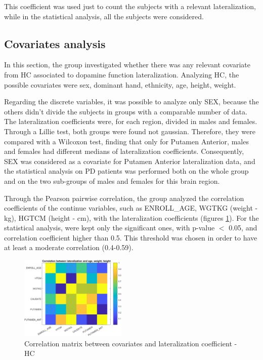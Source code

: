 \documentclass[]{article}
\begin{document}
\begin{multicols}{2}
This coefficient was used just to count the subjects with a relevant lateralization, while in the statistical analysis, all the subjects were considered.

\subsection{Covariates analysis}

In this section, the group investigated whether there was any relevant covariate from HC associated to dopamine function lateralization.
Analyzing HC, the possible covariates were sex, dominant hand, ethnicity, age, height, weight.

Regarding the discrete variables, it was possible to analyze only SEX, because the others didn't divide the subjects in groups with a comparable number of data. 
The lateralization coefficients were, for each region, divided in males and females. Through a Lillie test, both groups were found not gaussian. Therefore, they were compared with a Wilcoxon test, finding that only for Putamen Anterior, males and females had different medians of lateralization coefficients.
Consequently, SEX was considered as a covariate for Putamen Anterior lateralization data, and the statistical analysis on PD patients was performed both on the whole group and on the two sub-groups of males and females for this brain region.

Through the Pearson pairwise correlation, the group analyzed the correlation coefficients of the continue variables, such as ENROLL\_AGE, WGTKG (weight - kg), HGTCM (height - cm), with the lateralization coefficients (figures \ref{fig:cov_mat_hc}). For the statistical analysis, were kept only the significant ones, with p-value $<$ 0.05, and correlation coefficient higher than 0.5. This threshold was chosen in order to have at least a moderate correlation (0.4-0.59). 

\end{multicols}

\begin{figure}[h]
	\centering
	\includegraphics[width=2in]{../covariates_mat_hc}
	\caption{Correlation matrix between covariates and lateralization coefficient - HC}
	\label{fig:cov_mat_hc}
\end{figure} 
 
\end{document}
